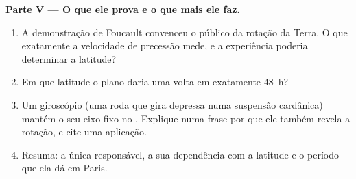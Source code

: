 \begin{problem}
\medskip
\noindent\textbf{Parte V --- O que ele prova e o que mais ele faz.}
\begin{enumerate}[resume]
  \item A demonstração de Foucault convenceu o público da rotação da Terra.
        O que exatamente a velocidade de precessão mede, e a experiência
        poderia determinar a latitude?
  \item Em que latitude o plano daria uma volta em exatamente \qty{48}{h}?
  \item Um giroscópio (uma roda que gira depressa numa suspensão cardânica)
        mantém o seu eixo fixo no . Explique numa
        frase por que ele também revela a rotação, e cite uma aplicação.
  \item Resuma: a única  responsável, a sua dependência com
        a latitude e o período que ela dá em Paris.
\end{enumerate}
\end{problem}
